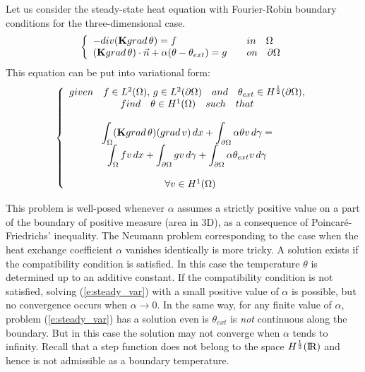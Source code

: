\medskip
Let us consider the steady-state heat equation with Fourier-Robin boundary conditions for the three-dimensional case.
\medskip 
\begin{equation} \label{e:eq_chal}
\left\{ \begin{array}{ll}
 - div ({\bf K} grad \, \theta) = f & \quad in \quad \Omega \\
({\bf K} grad \,\theta ) \cdot \vec{n} + \alpha (\theta-\theta_{ext}) = g & \quad on  \quad \partial \Omega  \\
\end{array} \right.
\end{equation}
\medskip
This equation can be put into variational form:
\begin{equation} \label{e:steady_var}
\left\{ \begin{array}{cc} 
given \quad f \in L^2(\Omega), \, g \in L^2(\partial\Omega) \quad and \quad \theta_{ext}\in H^{\frac{1}{2}}(\partial\Omega), \\
find \quad \theta \in H^1(\Omega) \quad such \quad that\\
\\
\displaystyle\int_{\Omega} ({\bf K} grad \,\theta)(grad \,v)\,dx
+ \int_{\partial\Omega} \alpha\theta v \,d\gamma = \\
\displaystyle \int_{\Omega} f v \, dx +
\displaystyle \int_{\partial\Omega} g v \,d\gamma +
\displaystyle \int_{\partial\Omega} \alpha \theta_{ext} v \,d\gamma \\
\\
\ \ \forall v \in H^1(\Omega)\\
\end{array} \right.  
\end{equation} 

This problem is well-posed whenever $\alpha$ assumes a strictly positive value on
a part of the boundary of positive measure (area in 3D), as a consequence of Poincar\'{e}-Friedrichs'
inequality. The Neumann problem corresponding to the case when the heat exchange coefficient
$\alpha$ vanishes identically is more tricky. A solution exists if the compatibility condition is 
satisfied. In this case the temperature $\theta$ is determined up to an additive constant.
If the compatibility condition is not satisfied, solving (\ref{e:steady_var}) with a 
small positive value of $\alpha$ is possible, but no convergence occurs when $\alpha \to 0$.
In the same way, for any finite value of $\alpha$, problem (\ref{e:steady_var}) has a solution
even is $\theta_{ext}$ is {\it not} continuous along the boundary. But in this case the solution
may not converge when $\alpha$ tends to infinity.
Recall that a step function does not belong to the space $H^{\frac{1}{2}}(\mbox{I\hspace{-.15em}R})$
and hence is not admissible as a boundary temperature.

